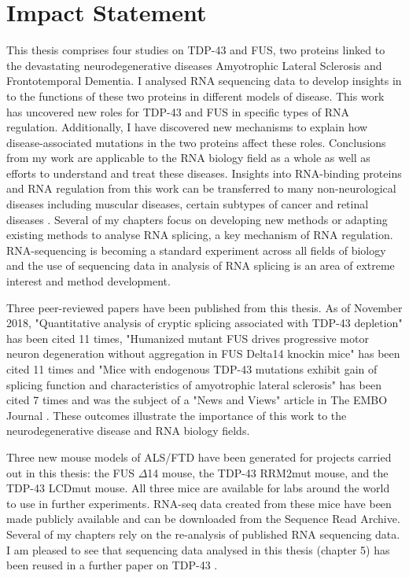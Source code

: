
\cleardoublepage

\section*{Impact Statement}

This thesis comprises four studies on TDP-43 and FUS, two proteins linked to the devastating neurodegenerative diseases Amyotrophic Lateral Sclerosis and Frontotemporal Dementia.
I analysed RNA sequencing data to develop insights in to the functions of these two proteins in different models of disease.
This work has uncovered new roles for TDP-43 and FUS in specific types of RNA regulation.
Additionally, I have discovered new mechanisms to explain how disease-associated mutations in the two proteins affect these roles.
Conclusions from my work are applicable to the RNA biology field as a whole as well as efforts to understand and treat these diseases.
Insights into RNA-binding proteins and RNA regulation from this work can be transferred to many non-neurological diseases including muscular diseases, certain subtypes of cancer and retinal diseases \citep{Scotti2015}. 
Several of my chapters focus on developing new methods or adapting existing methods to analyse RNA splicing, a key mechanism of RNA regulation.
RNA-sequencing is becoming a standard experiment across all fields of biology and the use of sequencing data in analysis of RNA splicing is an area of extreme interest and method development. 

Three peer-reviewed papers have been published from this thesis.
As of November 2018, "Quantitative analysis of cryptic splicing associated with TDP-43 depletion" \citep{Humphrey2017} has been cited 11 times, "Humanized mutant FUS drives progressive motor neuron degeneration without aggregation in FUS Delta14 knockin mice" \citep{Devoy2017} has been cited 11 times and "Mice with endogenous TDP-43 mutations exhibit gain of splicing function and characteristics of amyotrophic lateral sclerosis" \citep{Fratta2018} has been cited 7 times and was the subject of a "News and Views" article in The EMBO Journal \citep{Rouaux2018}.
These outcomes illustrate the importance of this work to the neurodegenerative disease and RNA biology fields.

Three new mouse models of ALS/FTD have been generated for projects carried out in this thesis: the FUS $\Delta$14 mouse, the TDP-43 RRM2mut mouse, and the TDP-43 LCDmut mouse. 
All three mice are available for labs around the world to use in further experiments.
RNA-seq data created from these mice have been made publicly available and can be downloaded from the Sequence Read Archive\footnotemark.
Several of my chapters rely on the re-analysis of published RNA sequencing data. 
I am pleased to see that sequencing data analysed in this thesis (chapter 5) has been reused in a further paper on TDP-43 \citep{Sivakumar2018}.

